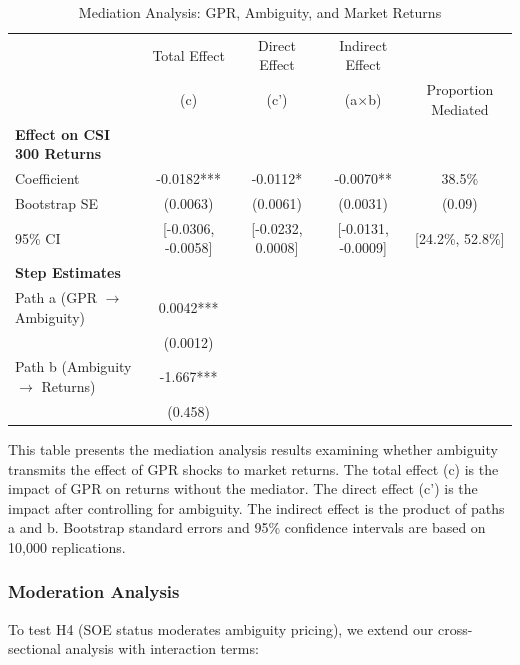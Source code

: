 \documentclass[preprint,12pt,authoryear]{elsarticle}
\begin{document}
\begin{table}
\centering
\caption{Mediation Analysis: GPR, Ambiguity, and Market Returns}
\label{tab:mediation}
\begin{threeparttable}
\begin{tabular*}{\textwidth}{@{\extracolsep{\fill}} lcccc @{\extracolsep{\fill}}}
\toprule
& Total Effect & Direct Effect & Indirect Effect & \\
& (c) & (c') & (a$\times$b) & Proportion Mediated \\
\midrule
\midrule
\textbf{Effect on CSI 300 Returns} & & & & \\
Coefficient & -0.0182*** & -0.0112* & -0.0070** & 38.5\% \\
Bootstrap SE & (0.0063) & (0.0061) & (0.0031) & (0.09) \\
95\% CI & [-0.0306, -0.0058] & [-0.0232, 0.0008] & [-0.0131, -0.0009] & [24.2\%, 52.8\%] \\
\midrule
\textbf{Step Estimates} & & & & \\
Path a (GPR $\rightarrow$ Ambiguity) & 0.0042*** & & & \\
& (0.0012) & & & \\
Path b (Ambiguity $\rightarrow$ Returns) & -1.667*** & & & \\
& (0.458) & & & \\
\bottomrule
\end{tabular*}
\begin{tablenotes}[flushleft]
\small
\item[] This table presents the mediation analysis results examining whether ambiguity transmits the effect of GPR shocks to market returns. The total effect (c) is the impact of GPR on returns without the mediator. The direct effect (c') is the impact after controlling for ambiguity. The indirect effect is the product of paths a and b. Bootstrap standard errors and 95\% confidence intervals are based on 10,000 replications.
\end{tablenotes}
\end{threeparttable}
\end{table}

\subsubsection{Moderation Analysis}

To test H4 (SOE status moderates ambiguity pricing), we extend our cross-sectional analysis with interaction terms:
\end{document}
